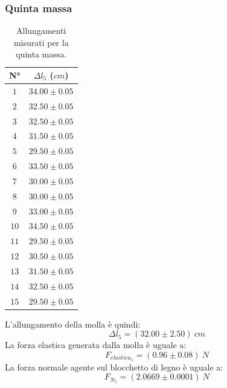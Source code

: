 \documentclass[11pt]{article}
\begin{document}
\subsubsection{Quinta massa}
\begin{table}[H]
\centering
\begin{tabular}{|c|c|}
\hline
\textbf{N°} & \textbf{$\Delta l_5$ ($cm$)}\\
\hline
$1$ & $34.00\pm 0.05$ \\
\hline
$2$ & $32.50\pm 0.05$ \\
\hline
$3$ & $32.50\pm 0.05$ \\
\hline
$4$ & $31.50\pm 0.05$ \\
\hline
$5$ & $29.50\pm 0.05$ \\
\hline
$6$ & $33.50\pm 0.05$ \\
\hline
$7$ & $30.00\pm 0.05$ \\
\hline
$8$ & $30.00\pm 0.05$ \\
\hline
$9$ & $33.00\pm 0.05$ \\
\hline
$10$ & $34.50\pm 0.05$ \\
\hline
$11$ & $29.50\pm 0.05$ \\
\hline
$12$ & $30.50\pm 0.05$ \\
\hline
$13$ & $31.50\pm 0.05$ \\
\hline
$14$ & $32.50\pm 0.05$ \\
\hline
$15$ & $29.50\pm 0.05$ \\
\hline
\end{tabular}
\caption{Allungamenti misurati per la quinta massa.}
\label{tab:}
\end{table}
L'allungamento della molla è quindi:
\begin{equation}
    \Delta l_5=(32.00\pm 2.50)\ cm
\end{equation}
La forza elastica generata dalla molla è uguale a:
\begin{equation}
    F_{elastica_5} = (0.96\pm 0.08)\ N
\end{equation}
La forza normale agente sul blocchetto di legno è uguale a:
\begin{equation}
    F_{N_5} = (2.0669\pm 0.0001)\ N
\end{equation}
\end{document}
